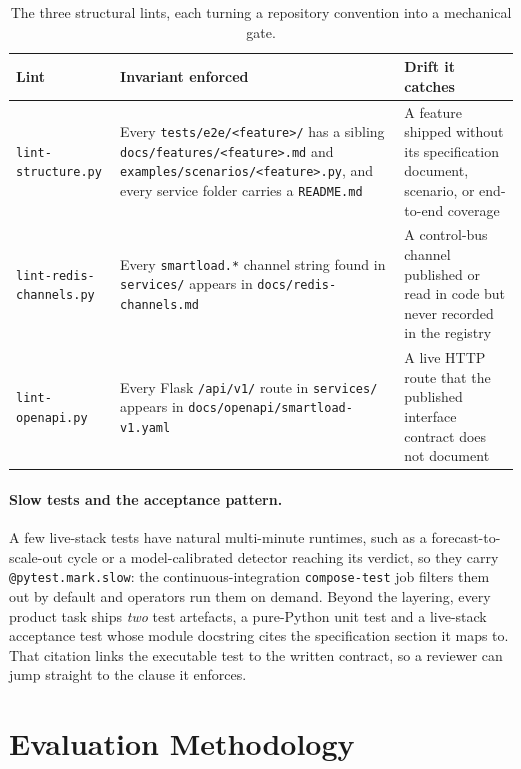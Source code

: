 \begin{table}[H]
  \centering
  \caption[The three structural lints]{The three structural lints, each turning a repository convention into a mechanical gate.}
  \label{tab:imc:lints}
  \small
  \begin{tabularx}{\linewidth}{@{}l Y Y@{}}
    \toprule
    \textbf{Lint} & \textbf{Invariant enforced} & \textbf{Drift it catches} \\
    \midrule
    \texttt{lint-structure.py}      & Every \texttt{tests/e2e/<feature>/} has a sibling \texttt{docs/features/<feature>.md} and \texttt{examples/\allowbreak scenarios/\allowbreak <feature>.py}, and every service folder carries a \texttt{README.md} & A feature shipped without its specification document, scenario, or end-to-end coverage \\
    \texttt{lint-redis-channels.py} & Every \texttt{smartload.*} channel string found in \texttt{services/} appears in \texttt{docs/redis-channels.md} & A control-bus channel published or read in code but never recorded in the registry \\
    \texttt{lint-openapi.py}        & Every Flask \texttt{/api/v1/} route in \texttt{services/} appears in \texttt{docs/\allowbreak openapi/\allowbreak smartload-v1.yaml} & A live HTTP route that the published interface contract does not document \\
    \bottomrule
  \end{tabularx}
\end{table}

\paragraph{Slow tests and the acceptance pattern.} A few live-stack tests have natural
multi-minute runtimes, such as a forecast-to-scale-out cycle or a model-calibrated
detector reaching its verdict, so they carry \texttt{@pytest.mark.slow}: the
continuous-integration \texttt{compose-test} job filters them out by default and
operators run them on demand. Beyond the layering, every product task ships \emph{two}
test artefacts, a pure-Python unit test and a live-stack acceptance test whose module
docstring cites the specification section it maps to. That citation links the
executable test to the written contract, so a reviewer can jump straight to the clause
it enforces.

\section{Evaluation Methodology}\label{imc:methodology}

